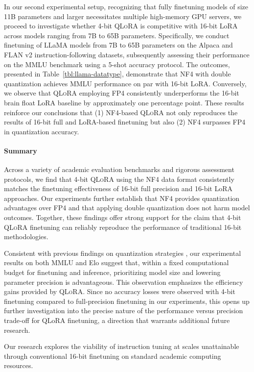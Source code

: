 In our second experimental setup, recognizing that fully finetuning models of size 11B parameters and larger necessitates multiple high-memory GPU servers, we proceed to investigate whether 4-bit \textsc{QLoRA} is competitive with 16-bit LoRA across models ranging from 7B to 65B parameters. Specifically, we conduct finetuning of LLaMA models from 7B to 65B parameters on the Alpaca and FLAN v2 instruction-following datasets, subsequently assessing their performance on the MMLU benchmark using a 5-shot accuracy protocol. The outcomes, presented in Table~\ref{tbl:llama-datatype}, demonstrate that NF4 with double quantization achieves MMLU performance on par with 16-bit LoRA. Conversely, we observe that \textsc{QLoRA} employing FP4 consistently underperforms the 16-bit brain float LoRA baseline by approximately one percentage point. These results reinforce our conclusions that (1) NF4-based \textsc{QLoRA} not only reproduces the results of 16-bit full and LoRA-based finetuning but also (2) NF4 surpasses FP4 in quantization accuracy.

\paragraph{Summary} Across a variety of academic evaluation benchmarks and rigorous assessment protocols, we find that 4-bit \textsc{QLoRA} using the NF4 data format consistently matches the finetuning effectiveness of 16-bit full precision and 16-bit LoRA approaches. Our experiments further establish that NF4 provides quantization advantages over FP4 and that applying double quantization does not harm model outcomes. Together, these findings offer strong support for the claim that 4-bit \textsc{QLoRA} finetuning can reliably reproduce the performance of traditional 16-bit methodologies.

Consistent with previous findings on quantization strategies \citep{dettmers2022case}, our experimental results on both MMLU and Elo suggest that, within a fixed computational budget for finetuning and inference, prioritizing model size and lowering parameter precision is advantageous. This observation emphasizes the efficiency gains provided by \textsc{QLoRA}. Since no accuracy losses were observed with 4-bit finetuning compared to full-precision finetuning in our experiments, this opens up further investigation into the precise nature of the performance versus precision trade-off for QLoRA finetuning, a direction that warrants additional future research.

Our research explores the viability of instruction tuning at scales unattainable through conventional 16-bit finetuning on standard academic computing resources.

